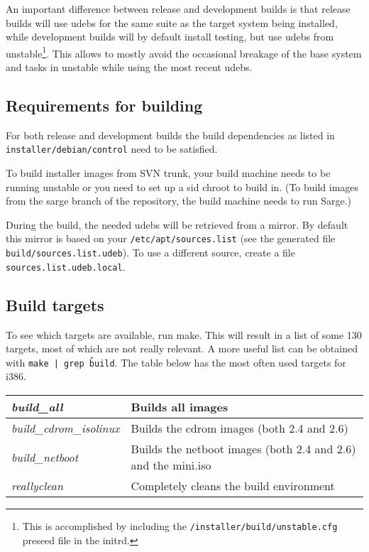 \documentclass[a4paper,10pt]{article}
\begin{document}
An important difference between release and development builds is that release builds will use udebs for the same suite as the target system being installed, while development builds will by default install testing, but use udebs from unstable\footnote{This is accomplished by including the \texttt{/installer/build/unstable.cfg} preseed file in the initrd.}. This allows to mostly avoid the occasional breakage of the base system and tasks in unstable while using the most recent udebs. 


\subsection{Requirements for building}
For both release and development builds the build dependencies as listed in \texttt{installer/debian/control} need to be satisfied. 

To build installer images from SVN trunk, your build machine needs to be running unstable or you need to set up a sid chroot to build in. (To build images from the sarge branch of the repository, the build machine needs to run Sarge.)

During the build, the needed udebs will be retrieved from a mirror. By default this mirror is based on your \texttt{/etc/apt/sources.list} (see the generated file \texttt{build/sources.list.udeb}). To use a different source, create a file \texttt{sources.list.udeb.local}.


\subsection{Build targets}
To see which targets are available, run make. This will result in a list of some 130 targets, most of which are not really relevant. A more useful list can be obtained with \texttt{make | grep \^build}. The table below has the most often used targets for i386.

\begin{tabular}{|l|l|}
\hline
\textit{build\_all} & Builds all images \\
\hline
\textit{build\_cdrom\_isolinux} & Builds the cdrom images (both 2.4 and 2.6) \\
\hline
\textit{build\_netboot} & Builds the netboot images (both 2.4 and 2.6) and the mini.iso \\
\hline
\textit{reallyclean} & Completely cleans the build environment \\
\hline
\end{tabular} 
\end{document}
